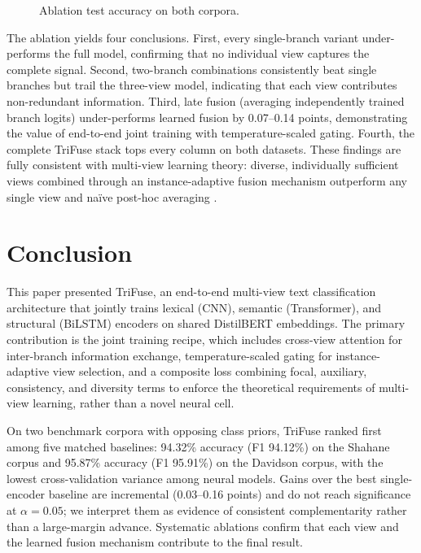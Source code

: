\documentclass[10pt,twocolumn,a4paper]{article}
\begin{document}
\begin{figure}[!t]
\centering

\caption{Ablation test accuracy on both corpora.}
\label{fig:ablation}
\end{figure}

The ablation yields four conclusions. First, every single-branch variant under-performs the full model, confirming that no individual view captures the complete signal. Second, two-branch combinations consistently beat single branches but trail the three-view model, indicating that each view contributes non-redundant information. Third, late fusion (averaging independently trained branch logits) under-performs learned fusion by 0.07--0.14 points, demonstrating the value of end-to-end joint training with temperature-scaled gating. Fourth, the complete TriFuse stack tops every column on both datasets. These findings are fully consistent with multi-view learning theory: diverse, individually sufficient views combined through an instance-adaptive fusion mechanism outperform any single view and na\"ive post-hoc averaging \citep{ref19}.

\section{Conclusion}\label{sec:conclusion}

This paper presented TriFuse, an end-to-end multi-view text classification architecture that jointly trains lexical (CNN), semantic (Transformer), and structural (BiLSTM) encoders on shared DistilBERT embeddings. The primary contribution is the joint training recipe, which includes cross-view attention for inter-branch information exchange, temperature-scaled gating for instance-adaptive view selection, and a composite loss combining focal, auxiliary, consistency, and diversity terms to enforce the theoretical requirements of multi-view learning, rather than a novel neural cell.

On two benchmark corpora with opposing class priors, TriFuse ranked first among five matched baselines: 94.32\% accuracy (F1 94.12\%) on the Shahane corpus and 95.87\% accuracy (F1 95.91\%) on the Davidson corpus, with the lowest cross-validation variance among neural models. Gains over the best single-encoder baseline are incremental (0.03--0.16 points) and do not reach significance at $\alpha{=}0.05$; we interpret them as evidence of consistent complementarity rather than a large-margin advance. Systematic ablations confirm that each view and the learned fusion mechanism contribute to the final result.
\end{document}
